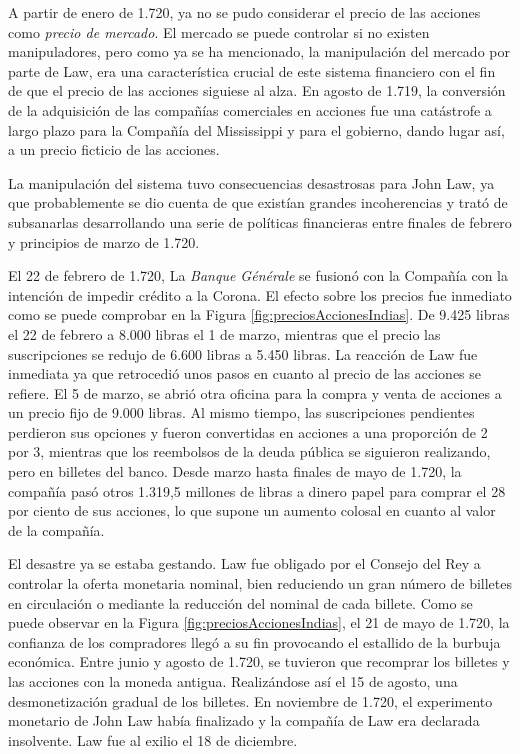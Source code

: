 A partir de enero de 1.720, ya no se pudo considerar el precio de las acciones como \emph{precio de mercado}. El mercado se puede controlar si no existen manipuladores, pero como ya se ha mencionado, la manipulación del mercado por parte de Law, era una característica crucial de este sistema financiero con el fin de que el precio de las acciones siguiese al alza. En agosto de 1.719, la conversión de la adquisición de las compañías comerciales en acciones fue una catástrofe a largo plazo para la Compañía del Mississippi y para el gobierno, dando lugar así, a un precio ficticio de las acciones.

La manipulación del sistema tuvo consecuencias desastrosas para John Law, ya que probablemente se dio cuenta de que existían grandes incoherencias y trató de subsanarlas desarrollando una serie de políticas financieras entre finales de febrero y principios de marzo de 1.720. 

El 22 de febrero de 1.720, La \emph{Banque Générale} se fusionó con la Compañía con la intención de impedir crédito a la Corona. El efecto sobre los precios fue inmediato como se puede comprobar en la Figura \ref{fig:preciosAccionesIndias}. De 9.425 libras el 22 de febrero a 8.000 libras el 1 de marzo, mientras que el precio las suscripciones se redujo de 6.600 libras a 5.450 libras. La reacción de Law fue inmediata ya que retrocedió unos pasos en cuanto al precio de las acciones se refiere. El 5 de marzo, se abrió otra oficina para la compra y venta de acciones a un precio fijo de 9.000 libras. Al mismo tiempo, las suscripciones pendientes perdieron sus opciones y fueron convertidas en acciones a una proporción de 2 por 3, mientras que los reembolsos de la deuda pública se siguieron realizando, pero en billetes del banco. Desde marzo hasta finales de mayo de 1.720, la compañía pasó otros 1.319,5 millones de libras a dinero papel para comprar el 28 por ciento de sus acciones, lo que supone un aumento colosal en cuanto al valor de la compañía.

El desastre ya se estaba gestando. Law fue obligado por el Consejo del Rey a controlar la oferta monetaria nominal, bien reduciendo un gran número de billetes en circulación o mediante la reducción del nominal de cada billete. Como se puede observar en la Figura \ref{fig:preciosAccionesIndias}, el 21 de mayo de 1.720, la confianza de los compradores llegó a su fin provocando el estallido de la burbuja económica. Entre junio y agosto de 1.720, se tuvieron que recomprar los billetes y las acciones con la moneda antigua. Realizándose así el 15 de agosto, una desmonetización gradual de los billetes. En noviembre de 1.720, el experimento monetario de John Law había finalizado y la compañía de Law era declarada insolvente. Law fue al exilio el 18 de diciembre.

